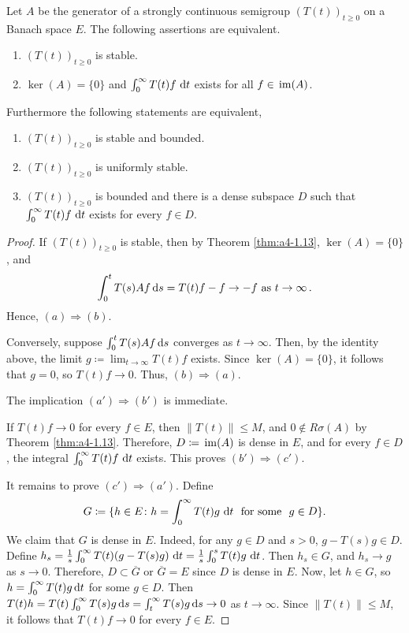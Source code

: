 \begin{theorem}\label{thm:a4-1.16}
Let $A$ be the generator of a strongly continuous semigroup $(T(t))_{t \geq 0}$ on a Banach space $E$. 
The following assertions are equivalent.
\begin{enumerate}[\upshape (a)]
\item 
$(T(t))_{t \geq 0}$ is stable.

\item 
$\ker(A) = \{0\}$ and $\int_{0}^{\infty} T(t)f \,\mathop{}\!\mathrm{d}{t}$ exists for all $f \in \mathop{}\mathrm{im}(A)$.

\end{enumerate}
Furthermore the following statements are equivalent,
\begin{enumerate}[(a')]
\item $(T(t))_{t \geq 0}$ is stable and bounded.
\item $(T(t))_{t \geq 0}$ is uniformly stable.
\item $(T(t))_{t \geq 0}$ is bounded and there is a dense subspace $D$ such that $\int_{0}^{\infty} T(t)f \,\mathop{}\!\mathrm{d}{t}$ exists for every $f \in D$.
\end{enumerate}
\end{theorem}

\begin{proof}
If $(T(t))_{t \geq 0}$ is stable, then by Theorem \ref{thm:a4-1.13}, $\ker(A) = \{0\}$, and
\[{
\int_{0}^{t} T(s)Af  \mathop{}\!\mathrm{d}{s} = T(t)f - f \to -f \ \text{as} \ t \to \infty\,.
}\]
Hence, $(a) \Rightarrow (b)$.

Conversely, suppose $\int_{0}^{t} T(s)Af  \mathop{}\!\mathrm{d}{s}$ converges as $t \to \infty$. Then, by
the identity above, the limit $g \coloneqq \lim_{t \to \infty} T(t)f$ exists. 
Since $\ker(A) = \{0\}$, it follows that $g = 0$, so $T(t)f \to 0$. 
Thus, $(b) \Rightarrow (a)$.

The implication $(a') \Rightarrow (b')$ is immediate. 

If $T(t)f \to 0$ for every $f \in E$, then $\|T(t)\| \leq M$, and $0 \not\in R\sigma(A)$ by Theorem \ref{thm:a4-1.13}. 
Therefore,
$D \coloneqq \mathop{}\mathrm{im}(A)$ is dense in $E$, and for every $f \in D$, the integral $\int_{0}^{\infty} T(t)f \,\mathop{}\!\mathrm{d}{t}$ exists. 
This proves $(b') \Rightarrow (c')$. 

It remains to prove $(c') \Rightarrow (a')$.
Define 
\[
G \coloneqq \{h \in E \colon h = \int_{0}^{\infty} T(t)g \,\mathop{}\!\mathrm{d}{t} \ \text{ for some } \ g \in D\}.
\] 
We claim that $G$ is dense in $E$. 
Indeed, for any $g\in D$ and $s>0$,  $g - T(s)g \in D$.
Define $h_{s} = \frac{1}{s} \int_{0}^{\infty} T(t)(g - T(s)g) \,\mathop{}\!\mathrm{d}{t} = \frac{1}{s} \int_{0}^{s} T(t)g \,\mathop{}\!\mathrm{d}{t}$. 
Then $h_{s} \in G$,
and $h_{s} \to g$ as $s \to 0$. 
Therefore, $D \subset \overline{G}$ or $\overline{G} = E$ since $D$ is dense in $E$. 
Now, let $h \in G$, so $h=\int_0^\infty T(t)g\mathop{}\!\mathrm{d}{t}$ for some $g\in D$.
Then $T(t)h = T(t) \int_{0}^{\infty} T(s)g  \mathop{}\!\mathrm{d}{s} = \int_{t}^{\infty} T(s)g  \mathop{}\!\mathrm{d}{s} \to 0$ as $t \to \infty$. 
Since $\|T(t)\| \leq M$, it follows that   $T(t)f \to 0$ for every $f \in E$.
\end{proof}

